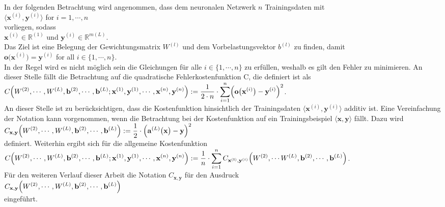 In der folgenden Betrachtung wird angenommen, dass dem neuronalen Netzwerk $n$ Trainingsdaten mit
\\[0.2cm]
\hspace*{1.3cm}
$\langle \mathbf{x}^{(i)}, \mathbf{y}^{(i)} \rangle$ \quad for $i=1,\cdots,n$ 
\\[0.2cm]
vorliegen, sodass 
\\[0.2cm]
\hspace*{1.3cm}
$\mathbf{x}^{(i)} \in \mathbb{R}^{(1)}$ und $\mathbf{y}^{(i)} \in \mathbb{R}^{m(L)}$.
\\[0.2cm]
Das Ziel ist eine Belegung der Gewichtungsmatrix $W^{(l)}$ und dem Vorbelastungsvektor $b^{(l)}$ zu finden, damit
\\[0.2cm]
\hspace*{1.3cm}
$\mathbf{o}\bigl(\mathbf{x}^{(i)}\bigr) = \mathbf{y}^{(i)}$ \quad for all $i \in \{1,\cdots,n\}$.
\\[0.2cm]
In der Regel wird es nicht möglich sein die Gleichungen für alle $i \in \{ 1, \cdots ,n \}$ zu erfüllen, weshalb es gilt den Fehler zu minimieren. An dieser Stelle fällt die Betrachtung auf die quadratische Fehlerkostenfunktion C, die definiert ist als
\\[0.2cm]
\hspace*{1.3cm}
$\displaystyle C\Bigr(W^{(2)}, \cdots, W^{(L)}, \mathbf{b}^{(2)}, \cdots, \mathbf{b}^{(L)};
     \mathbf{x}^{(1)}, \mathbf{y}^{(1)}, \cdots, \mathbf{x}^{(n)},\mathbf{y}^{(n)} \Bigr) := 
 \frac{1}{2 \cdot n} \cdot \sum\limits_{i=1}^n \Bigl(\mathbf{o}\bigl(\mathbf{x}^{(i)}\bigr) - \mathbf{y}^{(i)}\Bigr)^2
$.
\\[0.2cm]
An dieser Stelle ist zu berücksichtigen, dass die Kostenfunktion hinsichtlich der Trainingsdaten $\langle \mathbf{x}^{(i)},\mathbf{y}^{(i)} \rangle$ additiv ist. Eine Vereinfachung der Notation kann vorgenommen, wenn die Betrachtung bei der Kostenfunktion auf ein Trainingsbeispiel $\langle \mathbf{x},\mathbf{y} \rangle$ fällt. Dazu wird
\\[0.2cm]
\hspace*{1.3cm}
$\displaystyle C_{\mathbf{x}, \mathbf{y}}\Bigr(W^{(2)}, \cdots, W^{(L)}, \mathbf{b}^{(2)}, \cdots, \mathbf{b}^{(L)}\Bigr) := 
 \frac{1}{2} \cdot \Bigl(\mathbf{a}^{(L)}\bigl(\mathbf{x}\bigr) - \mathbf{y}\Bigr)^2
$
\\[0.2cm]
definiert. Weiterhin ergibt sich für die allgemeine Kostenfunktion
\\[0.2cm]
$\displaystyle C\Bigr(W^{(2)}, \cdots, W^{(L)}, \mathbf{b}^{(2)}, \cdots, \mathbf{b}^{(L)};
     \mathbf{x}^{(1)}, \mathbf{y}^{(1)}, \cdots, \mathbf{x}^{(n)},\mathbf{y}^{(n)} \Bigr) := 
 \frac{1}{n} \cdot \sum\limits_{i=1}^n C_{\mathbf{x^{(i)}}, \mathbf{y}^{(i)}}\Bigr(W^{(2)}, \cdots W^{(L)}, \mathbf{b}^{(2)}, \cdots, \mathbf{b}^{(L)}\Bigr) 
$.
\\[0.2cm]
Für den weiteren Verlauf dieser Arbeit die Notation $C_{\mathbf{x}, \mathbf{y}}$ für den Ausdruck
\\[0.2cm]
\hspace*{1.3cm}
$\displaystyle C_{\mathbf{x}, \mathbf{y}}\Bigr(W^{(2)}, \cdots, W^{(L)}, \mathbf{b}^{(2)}, \cdots, \mathbf{b}^{(L)}\Bigr)$
\\[0.2cm]
eingeführt.


